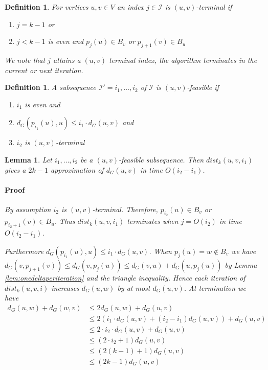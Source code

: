 \documentclass[12pt]{article}
\newtheorem{lem}[thm]{Lemma}
\newtheorem{defi}[thm]{Definition}
\begin{document}
\begin{defi}
For vertices $u,v \in V$ an index $j \in \mathcal{I}$ is $(u,v)$-terminal if
\begin{enumerate}
\item $j = k-1$ or
\item $j < k-1$ is even and $p_j(u) \in B_v$ or $p_{j+1}(v) \in B_u$ 
\end{enumerate}
We note that $j$ attains a $(u,v)$ terminal index, the algorithm terminates in the current or next iteration.
\end{defi}

\begin{defi}
A subsequence $\mathcal{I'}=i_1, \hdots, i_2$ of $\mathcal{I}$ is $(u,v)$-feasible if
\begin{enumerate}
\item $i_1$ is even and
\item $d_{G}(p_{i_1}(u),u) \leq i_1 \cdot d_G(u,v)$ and
\item $i_2$ is $(u,v)$-terminal
\end{enumerate}
\end{defi}

\begin{lem}
Let $i_1, \hdots, i_2$ be a $(u,v)$-feasible subsequence. Then $dist_k(u,v,i_1)$ gives a $2k-1$ approximation of $d_G(u,v)$ in time $O(i_2-i_1)$.
\paragraph{Proof} By assumption $i_2$ is $(u,v)$-terminal. Therefore, $p_{i_2}(u) \in B_v$ or $p_{i_2 + 1}(v) \in B_u$. Thus $dist_k(u,v,i_1)$ terminates when $j=O(i_2)$ in time $O(i_2-i_1)$.

Furthermore $d_{G}(p_{i_1}(u),u) \leq i_1 \cdot d_G(u,v)$. When $p_j(u) = w \not\in B_v$
we have $d_G(v,p_{j+1}(v)) \leq d_G(v,p_{j}(u)) \leq d_G(v,u) + d_G(u,p_j(u))$ by Lemma \ref{lem:onedeltaperiteration} and the triangle inequality. Hence each iteration of $dist_k(u,v,i)$ increases $d_G(u,w)$ by at most $d_G(u,v)$. At termination we have
\begin{align*}
d_G(u,w) + d_G(w,v) &\leq 2d_G(u,w) + d_G(u,v) \\
&\leq 2(i_1 \cdot d_G(u,v) + (i_2 - i_1)d_G(u,v)) + d_G(u,v) \\
&\leq 2 \cdot i_2 \cdot d_G(u,v) + d_G(u,v) \\
&\leq (2 \cdot i_2 + 1)d_G(u,v) \\
&\leq (2 (k-1) + 1)d_G(u,v) \\
&\leq (2k-1) d_G(u,v)
\end{align*}
\end{lem}
\end{document}
